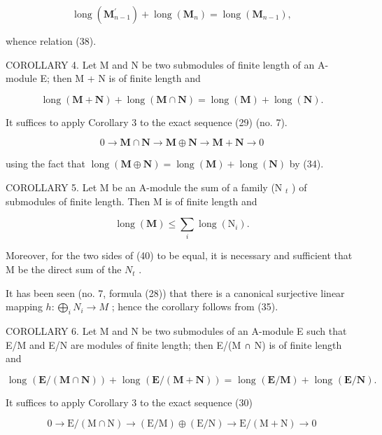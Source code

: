 \[
\operatorname{long} \left(\mathbf {M} _ {n - 1} ^ {\prime}\right) + \operatorname{long} \left(\mathbf {M} _ {n}\right) = \operatorname{long} \left(\mathbf {M} _ {n - 1}\right),
\]

whence relation (38).

COROLLARY 4. Let M and N be two submodules of finite length of an A-module E; then M + N is of finite length and

\[
\operatorname{long} (\mathbf {M} + \mathbf {N}) + \operatorname{long} (\mathbf {M} \cap \mathbf {N}) = \operatorname{long} (\mathbf {M}) + \operatorname{long} (\mathbf {N}).\tag{39}
\]

It suffices to apply Corollary 3 to the exact sequence (29) (no. 7).

\[
0 \rightarrow \mathbf {M} \cap \mathbf {N} \rightarrow \mathbf {M} \oplus \mathbf {N} \rightarrow \mathbf {M} + \mathbf {N} \rightarrow 0
\]

using the fact that \(\operatorname{long}(\mathbf{M} \oplus \mathbf{N}) = \operatorname{long}(\mathbf{M}) + \operatorname{long}(\mathbf{N})\) by (34).

COROLLARY 5. Let M be an A-module the sum of a family (N \(_{t}\) ) of submodules of finite length. Then M is of finite length and

\[
\operatorname{long} (\mathbf {M}) \leqslant \sum_ {i} \operatorname{long} \left(\mathrm{N} _ {i}\right).\tag{40}
\]

Moreover, for the two sides of (40) to be equal, it is necessary and sufficient that M be the direct sum of the \(N_{t}\) .

It has been seen (no. 7, formula (28)) that there is a canonical surjective linear mapping \(h \colon \bigoplus_{i} N_{i} \to M\) ; hence the corollary follows from (35).

COROLLARY 6. Let M and N be two submodules of an A-module E such that E/M and E/N are modules of finite length; then E/(M ∩ N) is of finite length and

\[
\text { long } (\mathbf {E} / (\mathbf {M} \cap \mathbf {N})) + \text { long } (\mathbf {E} / (\mathbf {M} + \mathbf {N})) = \text { long } (\mathbf {E} / \mathbf {M}) + \text { long } (\mathbf {E} / \mathbf {N}). \tag {41}
\]

It suffices to apply Corollary 3 to the exact sequence (30)

\[
0 \rightarrow \mathrm{E} / (\mathrm{M} \cap \mathrm{N}) \rightarrow (\mathrm{E} / \mathrm{M}) \oplus (\mathrm{E} / \mathrm{N}) \rightarrow \mathrm{E} / (\mathrm{M} + \mathrm{N}) \rightarrow 0
\]

